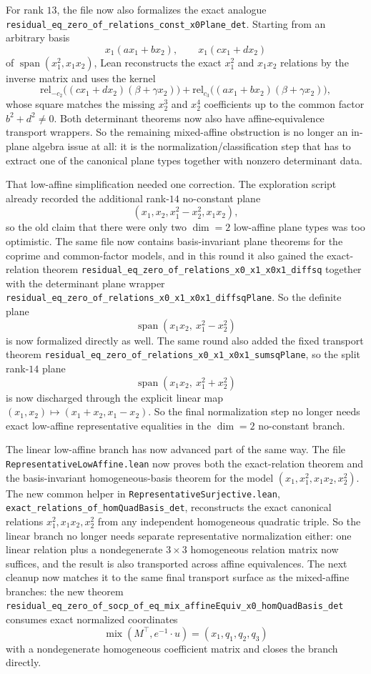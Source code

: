 \documentclass[11pt]{article}
\begin{document}
For rank $13$, the file now also formalizes the exact analogue
\texttt{residual\_eq\_zero\_of\_relations\_const\_x0Plane\_det}. Starting from
an arbitrary basis
\[
  x_1(a x_1+b x_2),\qquad x_1(c x_1+d x_2)
\]
of \(\operatorname{span}(x_1^2,x_1x_2)\), Lean reconstructs the exact
\(x_1^2\) and \(x_1x_2\) relations by the inverse matrix and uses the kernel
\[
  \mathrm{rel}_{-c_2}\bigl((c x_1+d x_2)(\beta+\gamma x_2)\bigr)
  +\mathrm{rel}_{c_3}\bigl((a x_1+b x_2)(\beta+\gamma x_2)\bigr),
\]
whose square matches the missing \(x_2^3\) and \(x_2^4\) coefficients up to
the common factor \(b^2+d^2\neq 0\). Both determinant theorems now also have
affine-equivalence transport wrappers. So the remaining mixed-affine
obstruction is no longer an in-plane algebra issue at all: it is the
normalization/classification step that has to extract one of the canonical
plane types together with nonzero determinant data.

That low-affine simplification needed one correction. The exploration script
already recorded the additional rank-\(14\) no-constant plane
\[
  (x_1,x_2,x_1^2-x_2^2,x_1x_2),
\]
so the old claim that there were only two \(\dim=2\) low-affine plane types
was too optimistic. The same file now contains basis-invariant plane theorems
for the coprime and common-factor models, and in this round it also gained the
exact-relation theorem
\texttt{residual\_eq\_zero\_of\_relations\_x0\_x1\_x0x1\_diffsq}
together with the determinant plane wrapper
\texttt{residual\_eq\_zero\_of\_relations\_x0\_x1\_x0x1\_diffsqPlane}.
So the definite plane
\[
  \operatorname{span}(x_1x_2,\ x_1^2-x_2^2)
\]
is now formalized directly as well. The same round also added the fixed
transport theorem
\texttt{residual\_eq\_zero\_of\_relations\_x0\_x1\_x0x1\_sumsqPlane}, so the
split rank-\(14\) plane
\[
  \operatorname{span}(x_1x_2,\ x_1^2+x_2^2)
\]
is now discharged through the explicit linear map
\((x_1,x_2)\mapsto(x_1+x_2,x_1-x_2)\). So the final normalization step no
longer needs exact low-affine representative equalities in the \(\dim=2\)
no-constant branch.

The linear low-affine branch has now advanced part of the same way. The file
\texttt{RepresentativeLowAffine.lean} now proves both the exact-relation
theorem and the basis-invariant homogeneous-basis theorem for the model
\((x_1,x_1^2,x_1x_2,x_2^2)\). The new common helper in
\texttt{RepresentativeSurjective.lean},
\texttt{exact\_relations\_of\_homQuadBasis\_det}, reconstructs the exact
canonical relations \(x_1^2,x_1x_2,x_2^2\) from any independent homogeneous
quadratic triple. So the linear branch no longer needs separate representative
normalization either: one linear relation plus a nondegenerate \(3\times 3\)
homogeneous relation matrix now suffices, and the result is also transported
across affine equivalences. The next cleanup now matches it to the same final
transport surface as the mixed-affine branches: the new theorem
\texttt{residual\_eq\_zero\_of\_socp\_of\_eq\_mix\_affineEquiv\_x0\_homQuadBasis\_det}
consumes exact normalized coordinates
\[
  \operatorname{mix}(M^\top,e^{-1}\!\cdot u)=(x_1,q_1,q_2,q_3)
\]
with a nondegenerate homogeneous coefficient matrix and closes the branch
directly.
\end{document}
